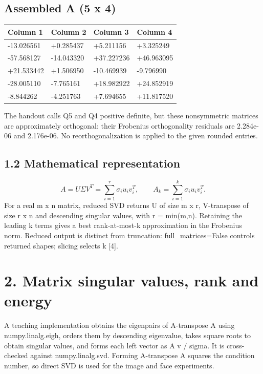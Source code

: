 \documentclass[a4paper,11pt]{article}
\begin{document}
\subsection*{Assembled A (5 x 4)}
\begin{center}\fontsize{8.5}{10.5}\selectfont\begin{tabular}{@{}llll@{}}\toprule
Column 1 & Column 2 & Column 3 & Column 4\\\midrule
-13.026561 & +0.285437 & +5.211156 & +3.325249\\
-57.568127 & -14.043320 & +37.227236 & +46.963095\\
+21.533442 & +1.506950 & -10.469939 & -9.796990\\
-28.005110 & -7.765161 & +18.982922 & +24.852919\\
-8.844262 & -4.251763 & +7.694655 & +11.817520\\
\bottomrule\end{tabular}\end{center}
The handout calls Q5 and Q4 positive definite, but these nonsymmetric matrices are approximately orthogonal: their Frobenius orthogonality residuals are 2.284e-06 and 2.176e-06. No reorthogonalization is applied to the given rounded entries.

\subsection*{1.2 Mathematical representation}
\[A=U\Sigma V^T=\sum_{i=1}^{r}\sigma_i u_i v_i^T,\qquad A_k=\sum_{i=1}^{k}\sigma_i u_i v_i^T.\]
For a real m x n matrix, reduced SVD returns U of size m x r, V-transpose of size r x n and descending singular values, with r = min(m,n). Retaining the leading k terms gives a best rank-at-most-k approximation in the Frobenius norm. Reduced output is distinct from truncation: full\_matrices=False controls returned shapes; slicing selects k [4].

\clearpage
\section*{2. Matrix singular values, rank and energy}
A teaching implementation obtains the eigenpairs of A-transpose A using numpy.linalg.eigh, orders them by descending eigenvalue, takes square roots to obtain singular values, and forms each left vector as A v / sigma. It is cross-checked against numpy.linalg.svd. Forming A-transpose A squares the condition number, so direct SVD is used for the image and face experiments.
\end{document}
